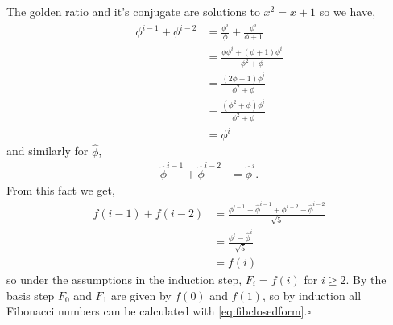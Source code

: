 \documentclass{article}
\begin{document}
The golden ratio and it's conjugate are solutions to $x^2 = x+1$ so we have,
\begin{align*}
\phi^{i-1} + \phi^{i-2} &= \frac{\phi^i}{\phi} + \frac{\phi^i}{\phi+1}\\
						&= \frac{\phi\phi^i + (\phi+1)\phi^i}{\phi^2 + \phi}\\
						&= \frac{(2\phi + 1)\phi^i}{\phi^2+\phi}\\
						&= \frac{(\phi^2 + \phi)\phi^i}{\phi^2+\phi}\\
						&= \phi^i
\end{align*}
and similarly for $\hat{\phi}$,
\begin{align*}
\hat{\phi}^{i-1} + \hat{\phi}^{i-2} &= \hat{\phi}^i.
\end{align*}
From this fact we get, 
\begin{align*}
f(i-1) + f(i-2) &= \frac{\phi^{i-1}-\hat{\phi}^{i-1} + \phi^{i-2}-\hat{\phi}^{i-2}}{\sqrt{5}}\\
&= \frac{\phi^i-\hat{\phi}^i }{\sqrt{5}}\\
&= f(i)
\end{align*}
so under the assumptions in the induction step, $F_i = f(i)$ for $i\geq2$. By the basis step $F_0$ and $F_1$ are given by $f(0)$ and $f(1)$, so by induction all Fibonacci numbers can be calculated with \eqref{eq:fibclosedform}.$\square$
\end{document}
